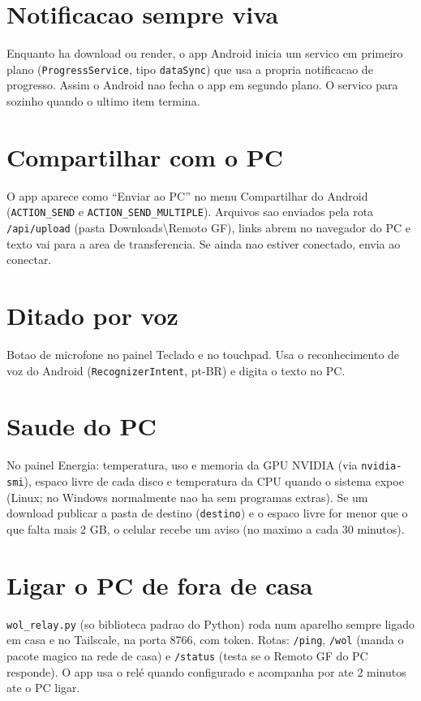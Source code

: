 \documentclass[11pt,a4paper]{article}
\begin{document}
\section{Notificacao sempre viva}
Enquanto ha download ou render, o app Android inicia um servico em primeiro plano
(\texttt{ProgressService}, tipo \texttt{dataSync}) que usa a propria notificacao de progresso.
Assim o Android nao fecha o app em segundo plano. O servico para sozinho quando o ultimo
item termina.

\section{Compartilhar com o PC}
O app aparece como ``Enviar ao PC'' no menu Compartilhar do Android (\texttt{ACTION\_SEND} e
\texttt{ACTION\_SEND\_MULTIPLE}). Arquivos sao enviados pela rota \texttt{/api/upload} (pasta
Downloads\textbackslash Remoto GF), links abrem no navegador do PC e texto vai para a area de
transferencia. Se ainda nao estiver conectado, envia ao conectar.

\section{Ditado por voz}
Botao de microfone no painel Teclado e no touchpad. Usa o reconhecimento de voz do Android
(\texttt{RecognizerIntent}, pt-BR) e digita o texto no PC.

\section{Saude do PC}
No painel Energia: temperatura, uso e memoria da GPU NVIDIA (via \texttt{nvidia-smi}),
espaco livre de cada disco e temperatura da CPU quando o sistema expoe (Linux; no Windows
normalmente nao ha sem programas extras). Se um download publicar a pasta de destino
(\texttt{destino}) e o espaco livre for menor que o que falta mais 2 GB, o celular recebe um
aviso (no maximo a cada 30 minutos).

\section{Ligar o PC de fora de casa}
\texttt{wol\_relay.py} (so biblioteca padrao do Python) roda num aparelho sempre ligado em
casa e no Tailscale, na porta 8766, com token. Rotas: \texttt{/ping}, \texttt{/wol} (manda o
pacote magico na rede de casa) e \texttt{/status} (testa se o Remoto GF do PC responde). O app
usa o relé quando configurado e acompanha por ate 2 minutos ate o PC ligar.
\end{document}
